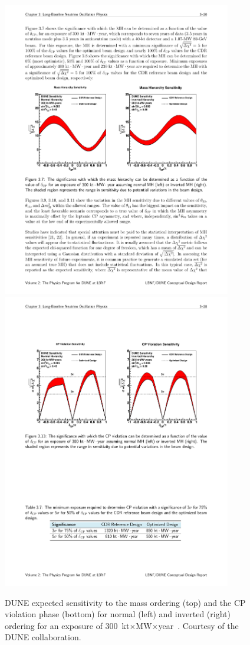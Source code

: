 \begin{figure} [htbp!]
\begin{center}
\includegraphics[width=10cm]{figures/dune_MO_sensi.pdf}
\includegraphics[width=10cm]{figures/dune_CP_sensi.pdf}
\caption{\label{fig:dunesensi} DUNE expected sensitivity to the mass ordering (top) and the CP violation phase (bottom) for normal (left) and inverted (right) ordering for an exposure of 300~kt$\times$MW$\times$year~\cite{Acciarri:2015uup}. Courtesy of the DUNE collaboration.}
\end{center}
\end{figure}


